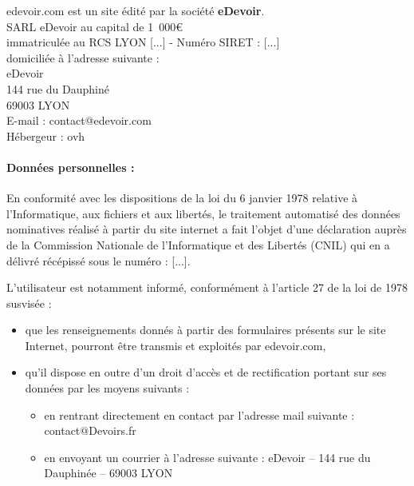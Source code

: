 \maketitle

edevoir.com est un site édité par la société \textbf{eDevoir}.\\

SARL eDevoir au capital de 1~000\euro\\
immatriculée au RCS LYON [...] - Numéro SIRET : [...]\\

domiciliée à l'adresse suivante :\\
eDevoir\\
144 rue du Dauphiné\\
69003 LYON\\
E-mail : contact@edevoir.com\\

Hébergeur : ovh\\

\paragraph*{Données personnelles :}
En conformité avec les dispositions de la loi du 6 janvier 1978 relative à l'Informatique, aux fichiers et aux libertés, le traitement automatisé des données nominatives réalisé à partir du site internet a fait l'objet d'une déclaration auprès de la Commission Nationale de l'Informatique et des Libertés (CNIL) qui en a délivré récépissé sous le numéro : [...].

L'utilisateur est notamment informé, conformément à l'article 27 de la loi de 1978 susvisée :
\begin{itemize}
   \item que les renseignements donnés à partir des formulaires présents sur le site Internet, pourront être transmis et exploités par edevoir.com,
   \item qu'il dispose en outre d'un droit d'accès et de rectification portant sur ses données par les moyens suivants :
   \begin{itemize}
      \item en rentrant directement en contact par l'adresse mail suivante : contact@Devoirs.fr
      \item en envoyant un courrier à l'adresse suivante : eDevoir -- 144 rue du Dauphinée -- 69003 LYON
   \end{itemize}
\end{itemize}